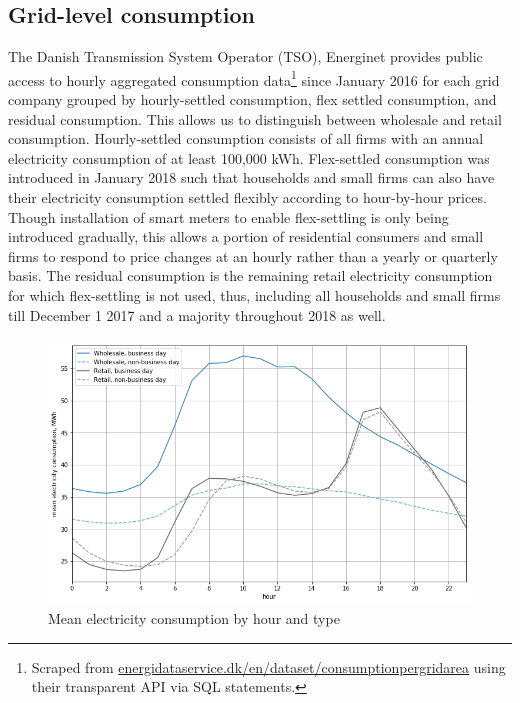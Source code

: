 \subsection{Grid-level consumption}
\label{subsec:d_consumption}
The Danish Transmission System Operator (TSO), Energinet provides public access to hourly aggregated consumption data\footnote{Scraped from \href{https://www.energidataservice.dk/en/dataset/consumptionpergridarea/}{energidataservice.dk/en/dataset/consumptionpergridarea} using their transparent API via SQL statements.} since January 2016 for each grid company grouped by hourly-settled consumption, flex settled consumption, and residual consumption. This allows us to distinguish between wholesale and retail consumption. Hourly-settled consumption consists of all firms with an annual electricity consumption of at least 100,000 kWh. Flex-settled consumption was introduced in January 2018 such that households and small firms can also have their electricity consumption settled flexibly according to hour-by-hour prices. Though installation of smart meters to enable flex-settling is only being introduced gradually, this allows a portion of residential consumers and small firms to respond to price changes at an hourly rather than a yearly or quarterly basis. The residual consumption is the remaining retail electricity consumption for which flex-settling is not used, thus, including all households and small firms till December 1 2017 and a majority throughout 2018 as well.
\begin{figure}[H]
  \centering
  \caption{Mean electricity consumption by hour and type}
    \label{fig:cons_hours}
  \includegraphics[width=1 \textwidth]{03_figures/cons_hours}
\end{figure}

